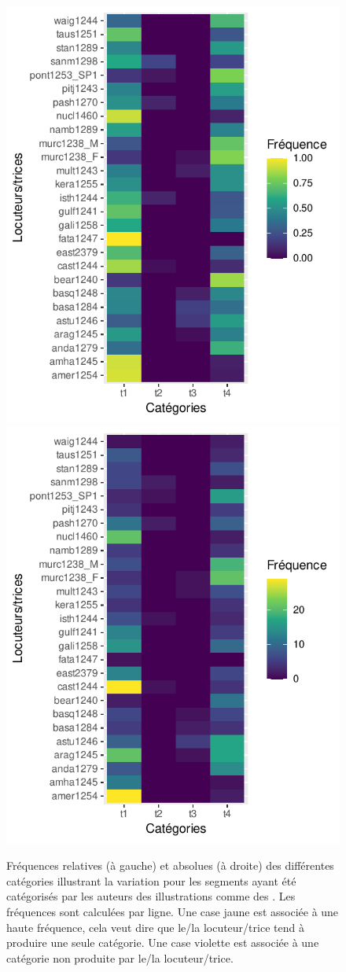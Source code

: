 \begin{figure}
	\centering
	\includegraphics[width=0.45\linewidth]{substance/images/variation_tapflap}
	\includegraphics[width=0.45\linewidth]{substance/images/variation_tapflap_abs}
	\caption[Fréquences des différentes catégories illustrant la variation pour les segments ayant été catégorisés comme des ]{Fréquences relatives (à gauche) et absolues (à droite) des différentes catégories illustrant la variation pour les segments ayant été catégorisés par les auteurs des illustrations comme des . Les fréquences sont calculées par ligne. Une case jaune est associée à une haute fréquence, cela veut dire que le/la locuteur/trice tend à produire une seule catégorie. Une case violette est associée à une catégorie non produite par le/la locuteur/trice.}
	\label{fig:variationtapflap}
\end{figure}

